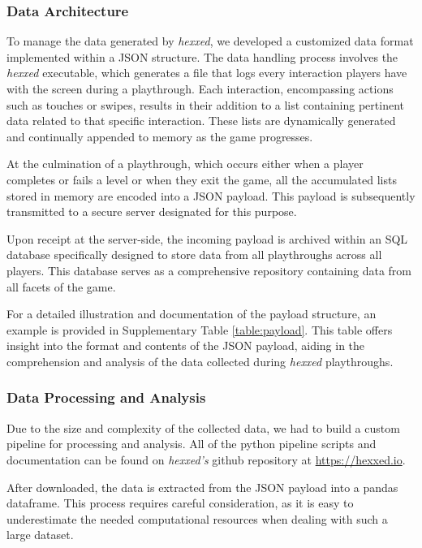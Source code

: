 \documentclass[11pt]{article}
\begin{document}
\subsubsection{Data Architecture}

To manage the data generated by \textit{hexxed}, we developed a customized data format implemented within a JSON structure. The data handling process involves the \textit{hexxed} executable, which generates a file that logs every interaction players have with the screen during a playthrough. Each interaction, encompassing actions such as touches or swipes, results in their addition to a list containing pertinent data related to that specific interaction. These lists are dynamically generated and continually appended to memory as the game progresses.

At the culmination of a playthrough, which occurs either when a player completes or fails a level or when they exit the game, all the accumulated lists stored in memory are encoded into a JSON payload. This payload is subsequently transmitted to a secure server designated for this purpose.

Upon receipt at the server-side, the incoming payload is archived within an SQL database specifically designed to store data from all playthroughs across all players. This database serves as a comprehensive repository containing data from all facets of the game.

For a detailed illustration and documentation of the payload structure, an example is provided in Supplementary Table \ref{table:payload}. This table offers insight into the format and contents of the JSON payload, aiding in the comprehension and analysis of the data collected during \textit{hexxed} playthroughs.



\subsubsection{Data Processing and Analysis}

Due to the size and complexity of the collected data, we had to build a custom pipeline for processing and analysis. All of the python pipeline scripts and documentation can be found on \textit{hexxed's} github repository at \url{https://hexxed.io}.

After downloaded, the data is extracted from the JSON payload into a pandas dataframe. This process requires careful consideration, as it is easy to underestimate the needed computational resources when dealing with such a large dataset.
\end{document}
